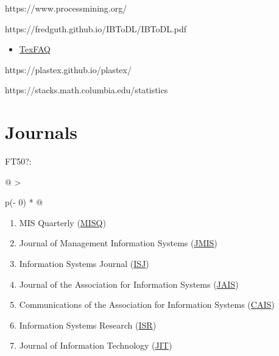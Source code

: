 \documentclass[
  letterpaper,
  DIV=11,
  numbers=noendperiod]{scrreprt}
\providecommand{\tightlist}{%
  \setlength{\itemsep}{0pt}\setlength{\parskip}{0pt}}\usepackage{longtable,booktabs,array}
\begin{document}
https://www.processmining.org/

https://fredguth.github.io/IBToDL/IBToDL.pdf

\begin{itemize}
\tightlist
\item
  \href{https://texfaq.org/FAQ-LaTeX2HTML}{TexFAQ}
\end{itemize}

https://plastex.github.io/plastex/

https://stacks.math.columbia.edu/statistics

\hypertarget{journals}{%
\chapter{Journals}\label{journals}}

FT50?:

\hypertarget{tbl-journals}{}
\begin{longtable}[]{@{}
  >{\raggedright\arraybackslash}p{(\columnwidth - 0\tabcolsep) * }@{}}
\caption{\label{tbl-journals}A star journals}\tabularnewline
\toprule\noalign{}
\endfirsthead
\endhead
\bottomrule\noalign{}
\endlastfoot
\begin{minipage}[t]{\linewidth}\raggedright
\begin{enumerate}
\def\labelenumi{\arabic{enumi}.}
\tightlist
\item
  MIS Quarterly (\href{https://misq.umn.edu/}{MISQ})
\item
  Journal of Management Information Systems
  (\href{https://jmis-web.org/}{JMIS})
\item
  Information Systems Journal
  (\href{https://onlinelibrary.wiley.com/journal/13652575}{ISJ})
\item
  Journal of the Association for Information Systems
  (\href{https://aisel.aisnet.org/jais/}{JAIS})
\item
  Communications of the Association for Information Systems
  (\href{https://aisel.aisnet.org/cais/}{CAIS})
\item
  Information Systems Research
  (\href{https://pubsonline.informs.org/journal/isre}{ISR})
\item
  Journal of Information Technology
  (\href{https://journals.sagepub.com/home/jina}{JIT})
\end{enumerate}
\end{minipage} \\
\end{longtable}
\end{document}
